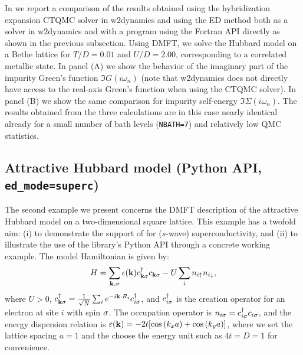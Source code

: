 \documentclass[edipack2.tex]{subfiles}
\begin{document}
In  we report a comparison of the results obtained using the hybridization expansion CTQMC solver in w2dynamics and using the \NAME ED method both as a solver in w2dynamics and with a program using the Fortran API directly as shown in the previous subsection. Using DMFT, we solve the Hubbard model on a Bethe lattice for $T/D=0.01$ and $U/D=2.00$, corresponding to a correlated metallic state. 
In panel (A) we show the behavior of the imaginary part of the impurity Green's function $\Im{G}(i\omega_n)$ (note that w2dynamics does not directly have access to the real-axis Green's function when using the CTQMC solver). In panel (B) we show the same comparison for impurity self-energy $\Im{\Sigma}(i\omega_n)$. 
The results obtained from the three calculations are in this case nearly identical already for a small number of bath levels ({\tt NBATH=7}) and relatively low QMC statistics.   



















\subsection{Attractive Hubbard model (Python API, {\tt ed\_mode=superc})}\label{SecExamplesAHM}
The second example we present concerns the DMFT description of the 
attractive Hubbard model on a two-dimensional square lattice. This 
example has a twofold aim: (i) to demonstrate the support of \NAME 
for ($s$-wave) superconductivity, and (ii) to illustrate the use of 
the library's Python API through a concrete working example. The 
model Hamiltonian is given by:
$$
H = \sum_{{\bf k},\sigma} \epsilon({\bf k}) c^\dagger_{{\bf k}\sigma} c_{{\bf k}\sigma} 
    - U \sum_i n_{i\uparrow} n_{i\downarrow},
$$
where $U > 0$, $c^\dagger_{{\bf k}\sigma} = \tfrac{1}{\sqrt{N}} 
\sum_i e^{-i{\bf k} \cdot R_i} c^\dagger_{i\sigma}$, and $c^\dagger_{i\sigma}$ 
is the creation operator for an electron at site $i$ with spin $\sigma$. 
The occupation operator is $n_{i\sigma} = c^\dagger_{i\sigma} c_{i\sigma}$, and 
the energy dispersion relation is $\varepsilon({\bf k})=-2t[\cos{(k_x a)}+
\cos{(k_y a)}]$, where we set the lattice spacing 
$a=1$  and the choose the energy unit such as $4t=D=1$ for convenience.
\end{document}

